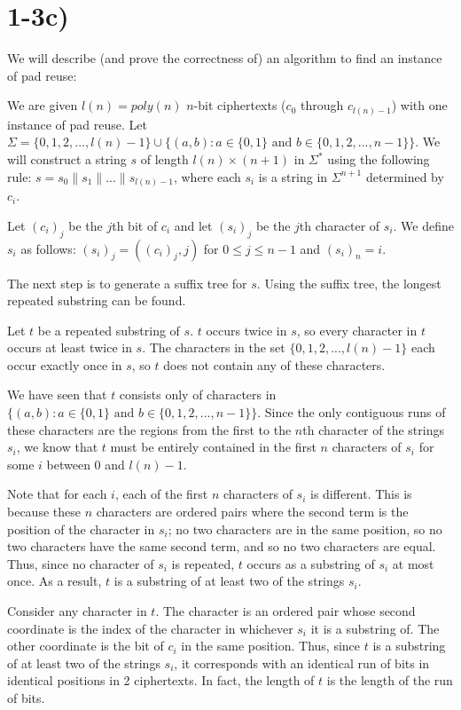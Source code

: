 \documentclass[11pt]{article}
\begin{document}
\section*{1-3c)}

We will describe (and prove the correctness of) an algorithm to find an instance of pad reuse:

We are given $l(n) = poly(n)$ $n$-bit ciphertexts ($c_0$ through $c_{l(n) -1}$) with one instance of pad reuse. Let $\Sigma=\{0,1,2,...,l(n)-1\}\cup \{(a,b) : a \in \{0,1\} \text{ and } b \in \{0,1,2,...,n-1\}\}$. We will construct a string $s$ of length $l(n)\times (n+1)$ in $\Sigma^*$ using the following rule: $s = s_0\|s_1\|...\|s_{l(n) -1}$, where each $s_i$ is a string in $\Sigma^{n+1}$ determined by $c_i$.

Let $(c_i)_j$ be the $j$th bit of $c_i$ and let $(s_i)_j$ be the $j$th character of $s_i$. We define $s_i$ as follows: $(s_i)_j = ((c_i)_j, j)$ for $0 \le j \le n-1$ and $(s_i)_n = i$.

The next step is to generate a suffix tree for $s$. Using the suffix tree, the longest repeated substring can be found. 

Let $t$ be a repeated substring of $s$. $t$ occurs twice in $s$, so every character in $t$ occurs at least twice in $s$. The characters in the set $\{0,1,2,...,l(n)-1\}$ each occur exactly once in $s$, so $t$ does not contain any of these characters.

We have seen that $t$ consists only of characters in $ \{(a,b) : a \in \{0,1\} \text{ and } b \in \{0,1,2,...,n-1\}\}$. Since the only contiguous runs of these characters are the regions from the first to the $n$th character of the strings $s_i$, we know that $t$ must be entirely contained in the first $n$ characters of $s_i$ for some $i$ between $0$ and $l(n)-1$. 

Note that for each $i$, each of the first $n$ characters of $s_i$ is different. This is because these $n$ characters are ordered pairs where the second term is the position of the character in $s_i$; no two characters are in the same position, so no two characters have the same second term, and so no two characters are equal. Thus, since no character of $s_i$ is repeated, $t$ occurs as a substring of $s_i$ at most once. As a result, $t$ is a substring of at least two of the strings $s_i$.

Consider any character in $t$. The character is an ordered pair whose second coordinate is the index of the character in whichever $s_i$ it is a substring of. The other coordinate is the bit of $c_i$ in the same position. Thus, since $t$ is a substring of at least two of the strings $s_i$, it corresponds with an identical run of bits in identical positions in 2 ciphertexts. In fact, the length of $t$ is the length of the run of bits. 
\end{document}
